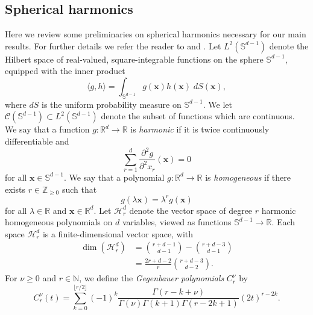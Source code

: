 \documentclass{article}
\theoremstyle{definition}
\newcommand*{\R}{\mathbb{R}}
\newcommand{\mc}{\mathcal}
\renewcommand{\S}{\mathbb{S}}
\def\vx{{\bm{x}}}
\begin{document}
\subsection{Spherical harmonics}
\label{sec:app-spherical}

Here we review some preliminaries on spherical harmonics necessary for our main results. For further details we refer the reader to \citet{efthimiou2014spherical} and \citet[Chapter 5]{axler2013harmonic}. Let $L^2(\S^{d - 1})$ denote the Hilbert space of real-valued, square-integrable functions on the sphere $\S^{d - 1}$, equipped with the inner product
\[
\langle g, h \rangle = \int_{\S^{d - 1}} g(\vx) {h(\vx)} \; dS(\vx), 
\]
where $dS$ is the uniform probability measure on $\S^{d - 1}$. We let $\mc{C}(\S^{d - 1}) \subset L^2(\S^{d - 1})$ denote the subset of functions which are continuous. We say that a function $g: \R^d \to \R$ is \emph{harmonic} if it is twice continuously differentiable and
\[\sum_{r = 1}^d \frac{\partial^2 g}{\partial^2 x_r}(\vx) = 0 \]
for all $\vx \in \S^{d - 1}$. We say that a polynomial $g: \R^d \to \mathbb{R}$ is \emph{homogeneous} if there exists $r \in \mathbb{Z}_{\geq 0}$ such that
\[g(\lambda \vx) = \lambda^r g(\vx)\]
for all $\lambda \in \R$ and $\vx \in \R^d$. Let $\mc{H}_r^d$ denote the vector space of degree $r$ harmonic homogeneous polynomials on $d$ variables, viewed as functions $\S^{d - 1} \to \mathbb{R}$. Each space $\mc{H}_r^d$ is a finite-dimensional vector space, with
\begin{align*}
    \dim(\mc{H}_r^d) &= \binom{r + d - 1}{d - 1} - \binom{r + d - 3}{d - 1}\\
    &= \frac{2r + d - 2}{r} \binom{r + d - 3}{d - 2}.
\end{align*}
For $\nu \geq 0$ and $r \in \mathbb{N}$, we define the \emph{Gegenbauer polynomials} $C_r^{\nu}$ by
\[C_r^{\nu}(t) = \sum_{k = 0}^{\lfloor r/2 \rfloor }(-1)^k \frac{\Gamma(r - k + \nu) }{\Gamma(\nu)\Gamma(k + 1)\Gamma(r - 2k + 1) }(2t)^{r - 2k}. \]
\end{document}
